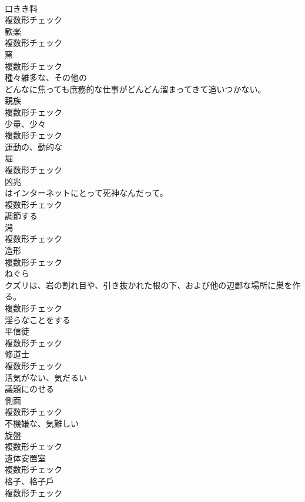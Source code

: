 \documentclass[8pt]{extreport}
\begin{document}
\begin{CJK}{UTF8}{min}
\\	[名詞]	口きき料	
\\	複数形チェック
\\	[名詞]	歓楽	
\\	複数形チェック
\\	[名詞]	窯	
\\	複数形チェック
\\	[形容詞]	種々雑多な、その他の	
\\	どんなに焦っても庶務的な仕事がどんどん溜まってきて追いつかない。	
\\	[名詞]	親族	
\\	複数形チェック
\\	[名詞]	少量、少々	
\\	複数形チェック
\\	[形容詞]	運動の、動的な	
\\	[名詞]	堀	
\\	複数形チェック
\\	[名詞]	凶兆	
\\	はインターネットにとって死神なんだって。	
\\	複数形チェック
\\	[動詞]	調節する	
\\	[名詞]	潟	
\\	複数形チェック
\\	[名詞]	造形	
\\	複数形チェック
\\	[名詞]	ねぐら	
\\	クズリは、岩の割れ目や、引き抜かれた根の下、および他の辺鄙な場所に巣を作る。	
\\	複数形チェック
\\	[動詞]	淫らなことをする	
\\	[名詞]	平信徒	
\\	複数形チェック
\\	[名詞]	修道士	
\\	複数形チェック
\\	[形容詞]	活気がない、気だるい	
\\	[動詞]	議題にのせる	
\\	[名詞]	側面	
\\	複数形チェック
\\	[形容詞]	不機嫌な、気難しい	
\\	[名詞]	旋盤	
\\	複数形チェック
\\	[名詞]	遺体安置室	
\\	複数形チェック
\\	[名詞]	格子、格子戶	
\\	複数形チェック

\end{CJK}
\end{document}
